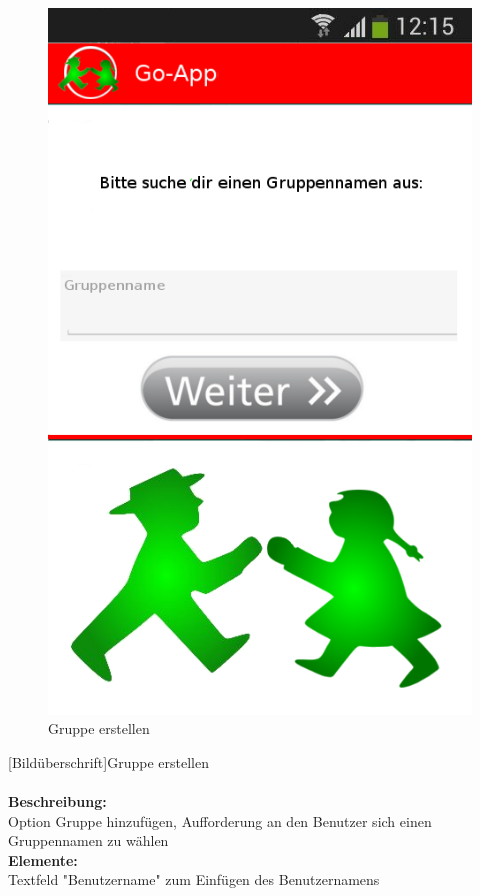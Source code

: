 \begin{figure}[H]
	\caption{Gruppe erstellen}
\begin{center}
	\includegraphics[scale =0.5]{resources/images/gruppe_erstellen.png}
\end{center}
\end{figure}
[Bildüberschrift]Gruppe erstellen\\ \\
\textbf{Beschreibung:}\\
Option Gruppe hinzufügen, Aufforderung an den Benutzer sich einen Gruppennamen zu wählen\\
\textbf{Elemente:}\\
Textfeld "Benutzername" zum Einfügen des Benutzernamens\\
